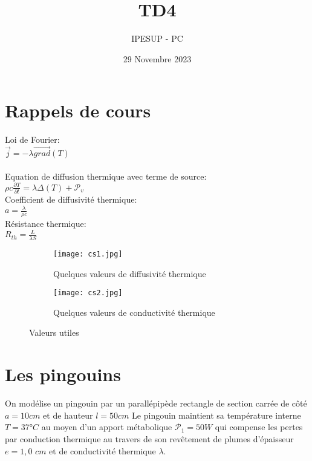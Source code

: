 \documentclass{article}
\title{TD4}
\author{IPESUP - PC }
\date{29 Novembre 2023}
\begin{document}
\maketitle



\section{Rappels de cours}
Loi de Fourier: 
\\[0.1cm]

$\vec{j}=-\lambda \vec{grad} (T) $
\\[0.1cm]

\\
Equation de diffusion thermique avec terme de source:
\\[0.1cm]

$\rho c \frac{\partial T}{\partial t }=\lambda \Delta (T) + \mathcal{P}_v$ 
\\[0.2cm]
Coefficient de diffusivité thermique: 
\\[0.1cm]

$a=\frac{\lambda}{\rho c}$
 \\[0.1cm]

Résistance thermique: 
\\[0.1cm]

$R_{th} = \frac{L}{\lambda S}$


\begin{figure}[h]
  \centering
  \begin{subfigure}{0.3\textwidth}
    \texttt{[image: cs1.jpg]}
    \caption{Quelques valeurs de diffusivité thermique}
    \label{fig:subfig1}
  \end{subfigure}
  \hfill
  \begin{subfigure}{0.4\textwidth}
    \texttt{[image: cs2.jpg]}
    \caption{Quelques valeurs de conductivité thermique}
    \label{fig:subfig2}
  \end{subfigure}
  \caption{Valeurs utiles}
  \label{fig:general}
\end{figure}
 

\section{Les pingouins}
On modélise un pingouin par un parallépipède rectangle de section carrée de côté $a=10cm$ et de hauteur $l = 50 cm$  Le pingouin maintient sa température interne $T = 37 $°$ C$ au moyen
d'un apport métabolique $\mathcal{P}_1 = 50 W $ qui compense les pertes par conduction thermique au
travers de son revêtement de plumes d'épaisseur $e = 1,0 $ $cm$ et de conductivité thermique $\lambda$.
\end{document}
